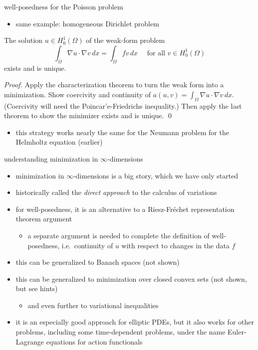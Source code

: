 \documentclass[10pt,
               svgnames,
               hyperref={colorlinks,
                         citecolor=DeepPink4,
                         linkcolor=FireBrick,
                         urlcolor=blue},
               usepdftitle=false]{beamer}
\newcommand{\grad}{\nabla}
\begin{document}
\begin{frame}{well-posedness for the Poisson problem}

\begin{itemize}
\item same example: homogeneous Dirichlet problem
\end{itemize}

\begin{corollary}
The solution $u\in H_0^1(\Omega)$ of the weak-form problem
    $$\int_\Omega \grad u \cdot \grad v\,dx = \int_\Omega f v\,dx \quad \text{ for all } v\in H_0^1(\Omega)$$
exists and is unique.
\end{corollary}

{\small
\emph{Proof.}  Apply the characterization theorem to turn the weak form into a minimization.  Show coercivity and continuity of $a(u,v) = \int_\Omega \grad u \cdot \grad v\,dx$.  (Coercivity will need the Poincar'e-Friedrichs inequality.)  Then apply the last theorem to show the minimizer exists and is unique. \hfill \qed
}

\bigskip
\begin{itemize}
\item this strategy works nearly the same for the Neumann problem for the Helmholtz equation (earlier)
\end{itemize}
\end{frame}


\begin{frame}{understanding minimization in $\infty$-dimensions}

\begin{itemize}
\item minimization in $\infty$-dimensions is a big story, which we have only started
\item historically called the \emph{direct approach} to the \alert{calculus of variations}
\item for well-posedness, it is an alternative to a Riesz-Fr\'echet representation theorem argument
    \begin{itemize}
    \item[$\circ$] a separate argument is needed to complete the definition of well-posedness, i.e.~continuity of $u$ with respect to changes in the data $f$
    \end{itemize}
\item this can be generalized to Banach spaces (not shown)
\item this can be generalized to minimization over closed convex sets (not shown, but see hints)
    \begin{itemize}
    \item[$\circ$] and even further to \alert{variational inequalities}
    \end{itemize}
\item it is an especially good approach for \alert{elliptic PDEs}, but it also works for other problems, including some time-dependent problems, under the name \alert{Euler-Lagrange equations} for action functionals
\end{itemize}
\end{frame}
\end{document}
